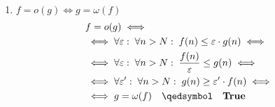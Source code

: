 \begin{enumerate}
	\item $f = o(g) \iff g = \omega(f)$
	\begin{align*}
		& f = o(g) \iff& \\
		& \iff \forall \varepsilon:\; \forall n>N:\; f(n) \le \varepsilon\cdot g(n) \iff& \\		
		& \iff \forall \varepsilon:\; \forall n>N:\; \frac{f(n)}{\varepsilon} \le g(n) \iff& \\
		& \iff\forall \varepsilon':\; \forall n>N:\; g(n) \ge \varepsilon'\cdot f(n) \iff& \\
		& \iff g = \omega(f) \quad \qedsymbol \quad \textbf{True} & 
	\end{align*}
	
\end{enumerate}